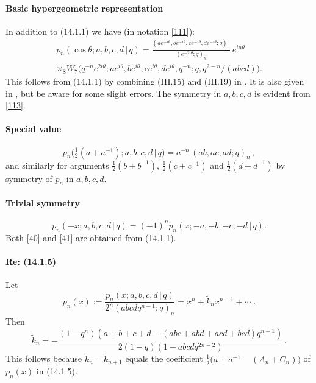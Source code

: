 \documentclass[twoside,11pt]{article}
\newcommand\tha\theta
\newcommand\thalf{\tfrac12}
\newcommand\wt{\widetilde}
\begin{document}
\paragraph{Basic hypergeometric representation}
In addition to (14.1.1) we have (in notation \eqref{111}):
\begin{multline}
p_n(\cos\tha;a,b,c,d\,|\, q)
=\frac{(ae^{-i\tha},be^{-i\tha},ce^{-i\tha},de^{-i\tha};q)_n}
{(e^{-2i\tha};q)_n}\,e^{in\tha}\\
\times {}_8W_7\big(q^{-n}e^{2i\tha};ae^{i\tha},be^{i\tha},
ce^{i\tha},de^{i\tha},q^{-n};q,q^{2-n}/(abcd)\big).
\label{113}
\end{multline}
This follows from (14.1.1) by combining (III.15) and (III.19) in
.
It is also given in , but be aware for some slight errors.
The symmetry in $a,b,c,d$ is evident from \eqref{113}.
%
\paragraph{Special value}
\begin{equation}
p_n\big(\thalf(a+a^{-1});a,b,c,d\,|\, q\big)=a^{-n}\,(ab,ac,ad;q)_n\,,
\label{40}
\end{equation}
and similarly for arguments $\thalf(b+b^{-1})$, $\thalf(c+c^{-1})$ and
$\thalf(d+d^{-1})$ by symmetry of $p_n$ in $a,b,c,d$.
%
\paragraph{Trivial symmetry}
\begin{equation}
p_n(-x;a,b,c,d\,|\, q)=(-1)^n p_n(x;-a,-b,-c,-d\,|\, q).
\label{41}
\end{equation}
Both \eqref{40} and \eqref{41} are obtained from (14.1.1).
%
\paragraph{Re: (14.1.5)}
Let
\begin{equation}
p_n(x):=\frac{p_n(x;a,b,c,d\,|\, q)}{2^n(abcdq^{n-1};q)_n}=x^n+\wt k_n x^{n-1}
+\cdots\;.
\label{18}
\end{equation}
Then
\begin{equation}
\wt k_n=-\frac{(1-q^n)(a+b+c+d-(abc+abd+acd+bcd)q^{n-1})}
{2(1-q)(1-abcdq^{2n-2})}\,.
\label{19}
\end{equation}
This follows because $\tilde k_n-\tilde k_{n+1}$ equals the coefficient
$\thalf\bigl(a+a^{-1}-(A_n+C_n)\bigr)$ of $p_n(x)$ in (14.1.5).
%
\end{document}
